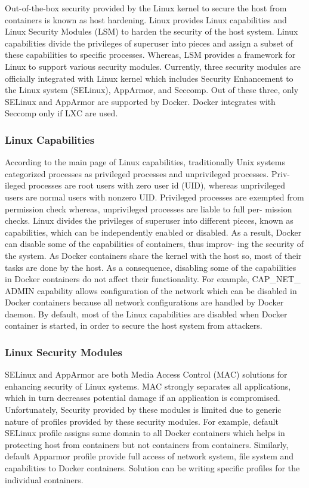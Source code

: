 \documentclass[a4paper,num-refs]{oup-contemporary}
\begin{document}
Out-of-the-box security provided by the Linux kernel to secure the host from
containers is known as host hardening. Linux provides Linux capabilities and
Linux Security Modules (LSM) to harden the security of the host system. Linux
capabilities divide the privileges of superuser into pieces and assign a subset of
these capabilities to specific processes. Whereas, LSM provides a framework for
Linux to support various security modules. Currently, three security modules
are officially integrated with Linux kernel which includes Security Enhancement
to the Linux system (SELinux), AppArmor, and Seccomp. Out of these three, 
only SELinux and AppArmor are supported by Docker. Docker integrates with 
Seccomp only if LXC are used.

\subsubsection{Linux Capabilities}

According to the main page of Linux capabilities, traditionally Unix systems
categorized processes as privileged processes and unprivileged processes. Priv-
ileged processes are root users with zero user id (UID), whereas unprivileged
users are normal users with nonzero UID. Privileged processes are exempted
from permission check whereas, unprivileged processes are liable to full per-
mission checks. Linux divides the privileges of superuser into different pieces,
known as capabilities, which can be independently enabled or disabled. As a
result, Docker can disable some of the capabilities of containers, thus improv-
ing the security of the system. As Docker containers share the kernel with the
host so, most of their tasks are done by the host. As a consequence, disabling
some of the capabilities in Docker containers do not affect their functionality.
For example, CAP\_NET\_ ADMIN capability allows configuration of the network
which can be disabled in Docker containers because all network configurations
are handled by Docker daemon. By default, most of the Linux capabilities are
disabled when Docker container is started, in order to secure the host system
from attackers.

\subsubsection{Linux Security Modules}

SELinux and AppArmor are both Media Access Control (MAC) solutions for 
enhancing security of Linux systems. MAC strongly separates all 
applications, which in turn decreases potential damage if an 
application is compromised. Unfortunately, Security provided by these modules 
is limited due to generic nature of profiles
provided by these security modules. For example, default SELinux profile
assigns same domain to all Docker containers which helps in protecting host from
containers but not containers from containers. Similarly, default Apparmor
profile provide full access of network system, file system and capabilities to
Docker containers. Solution can be writing specific profiles for the individual
containers.
\end{document}

